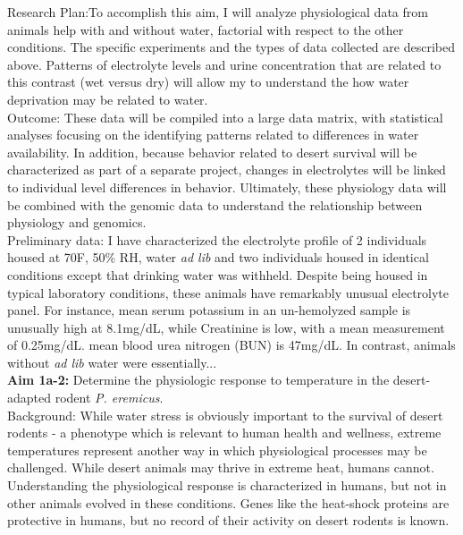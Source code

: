 \documentclass[11pt]{article}
\begin{document}
Research Plan:To accomplish this aim, I will analyze physiological data from animals help with and without water, factorial with respect to the other conditions. The specific experiments and the types of data collected are described above. Patterns of electrolyte levels and urine concentration that are related to this contrast (wet versus dry) will allow my to understand the how water deprivation may be related to water.   \\

Outcome: These data will be compiled into a large data matrix, with statistical analyses focusing on the identifying patterns related to differences in water availability. In addition, because behavior related to desert survival will be characterized as part of a separate project, changes in electrolytes will be linked to individual level differences in behavior. Ultimately, these physiology data will be combined with the genomic data to understand the relationship between physiology and genomics. \\

Preliminary data: I have characterized the electrolyte profile of 2 individuals housed at 70F, 50\% RH, water \textit{ad lib} and two individuals housed in identical conditions except that drinking water was withheld. Despite being housed in typical laboratory conditions, these animals have remarkably unusual electrolyte panel. For instance, mean serum potassium in an un-hemolyzed sample is unusually high at 8.1mg/dL, while Creatinine is low, with a mean measurement of 0.25mg/dL. mean blood urea nitrogen (BUN) is 47mg/dL. In contrast, animals without \textit{ad lib} water were essentially... \\   

\noindent \textbf{Aim 1a-2:} Determine the physiologic response to temperature in the desert-adapted rodent \textit{P. eremicus}. \\

Background: While water stress is obviously important to the survival of desert rodents - a phenotype which is relevant to human health and wellness, extreme temperatures represent another way in which physiological processes may be challenged. While desert animals may thrive in extreme heat, humans cannot. Understanding the physiological response is characterized in humans, but not in other animals evolved in these conditions. Genes like the heat-shock proteins are protective in humans, but no record of their activity on desert rodents is known.  \\
\end{document}
